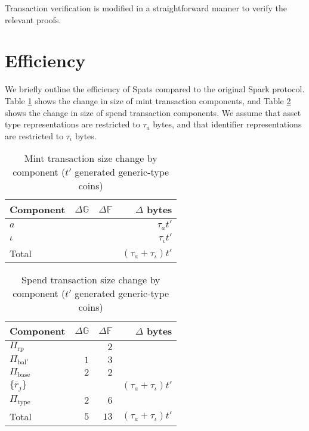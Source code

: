 \documentclass{article}
\newcommand{\G}{\mathbb{G}}
\newcommand{\F}{\mathbb{F}}
\begin{document}
Transaction verification is modified in a straightforward manner to verify the relevant proofs.


\section{Efficiency}

We briefly outline the efficiency of Spats compared to the original Spark protocol.
Table \ref{table:size_mint} shows the change in size of mint transaction components, and Table \ref{table:size_spend} shows the change in size of spend transaction components.
We assume that asset type representations are restricted to $\tau_a$ bytes, and that identifier representations are restricted to $\tau_\iota$ bytes.

\begin{table}[ht]
    \centering
    \begin{tabular}{|l|r|r|r|}
    \hline
    \textbf{Component} & \textbf{$\Delta\G$} & \textbf{$\Delta\F$} & \textbf{$\Delta$ bytes} \\
    \hline
    $a$ & &  & $\tau_a t'$ \\
    $\iota$ & &  & $\tau_\iota t'$ \\
    \hline
    Total & & & $(\tau_a + \tau_\iota) t'$ \\
    \hline
    \end{tabular}
    \caption{Mint transaction size change by component ($t'$ generated generic-type coins)}
    \label{table:size_mint}
\end{table}

\begin{table}[ht]
    \centering
    \begin{tabular}{|l|r|r|r|}
    \hline
    \textbf{Component} & \textbf{$\Delta\G$} & \textbf{$\Delta\F$} & \textbf{$\Delta$ bytes} \\
    \hline
    $\Pi_{\text{rp}}$ & & $2$ & \\
    $\Pi_{\text{bal}'}$ & $1$ & $3$ & \\
    $\Pi_{\text{base}}$ & $2$ & $2$ & \\
    $\{\overline{r}_j\}$ & & & $(\tau_a + \tau_\iota) t'$ \\
    $\Pi_{\text{type}}$ & $2$ & $6$ & \\
    \hline
    Total & $5$ & $13$ & $(\tau_a + \tau_\iota) t'$ \\
    \hline
    \end{tabular}
    \caption{Spend transaction size change by component ($t'$ generated generic-type coins)}
    \label{table:size_spend}
\end{table}
\end{document}
